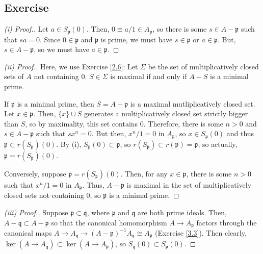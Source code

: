 \subsection{Exercise}\label{4.10}

\begin{proof}[(i) Proof.]
Let $a \in S_{\mathfrak{p}}(0)$. Then, $0 \equiv a/1 \in A_{\mathfrak{p}}$, so there is some $s \in A - \mathfrak{p}$ such that $s a = 0$. Since $0 \in \mathfrak{p}$ and $\mathfrak{p}$
is prime, we must have $s \in \mathfrak{p}$ or $a \in \mathfrak{p}$. But, $s \in A - \mathfrak{p}$, so we must have $a \in \mathfrak{p}$.
\end{proof}

\begin{proof}[(ii) Proof.]
Here, we use Exercise \ref{2.6}: Let $\Sigma$ be the set of multiplicatively closed sets of $A$ not containing $0$. $S \in \Sigma$ is maximal if and only if $A-S$ is a minimal prime.

If $\mathfrak{p}$ is a minimal prime, then $S = A - \mathfrak{p}$ is a maximal mutliplicatively closed set. Let $x \in \mathfrak{p}$. Then, $\{x\} \cup S$ generates a multiplicatively closed
set strictly bigger than $S$, so by maximality, this set contains $0$. Therefore, there is some $n > 0$ and $s \in A - \mathfrak{p}$ such that $s x^n = 0$. But then, $x^n/1 = 0$ in $A_{\mathfrak{p}}$,
so $x \in S_{\mathfrak{p}}(0)$ and thus $\mathfrak{p} \subset r(S_{\mathfrak{p}})(0)$. By (i), $S_{\mathfrak{p}}(0) \subset \mathfrak{p}$, so $r(S_{\mathfrak{p}}) \subset r(\mathfrak{p}) = \mathfrak{p}$,
so actually, $\mathfrak{p} = r(S_{\mathfrak{p}})(0)$.

Conversely, suppose $\mathfrak{p} = r(S_{\mathfrak{p}})(0)$. Then, for any $x \in \mathfrak{p}$, there is some $n>0$ such that $x^n/1 = 0$ in $A_{\mathfrak{p}}$. Thus, $A - \mathfrak{p}$ is maximal
in the set of multiplicatively closed sets not containing $0$, so $\mathfrak{p}$ is a minimal prime.
\end{proof}

\begin{proof}[(iii) Proof.]
Suppose $\mathfrak{p} \subset \mathfrak{q}$, where $\mathfrak{p}$ and $\mathfrak{q}$ are both prime ideals. Then, $A - \mathfrak{q} \subset A - \mathfrak{p}$ so that the canonical homomorphism
$A \to A_{\mathfrak{p}}$ factors through the canonical maps $A \to A_{\mathfrak{q}} \to (A - \mathfrak{p})^{-1}A_{\mathfrak{q}} \cong A_{\mathfrak{p}}$ (Exercise \ref{3.3}). 
Then clearly, $\ker(A \to A_{\mathfrak{q}}) \subset \ker(A \to A_{\mathfrak{p}})$, so $S_{\mathfrak{q}}(0) \subset S_{\mathfrak{p}}(0)$.
\end{proof}

